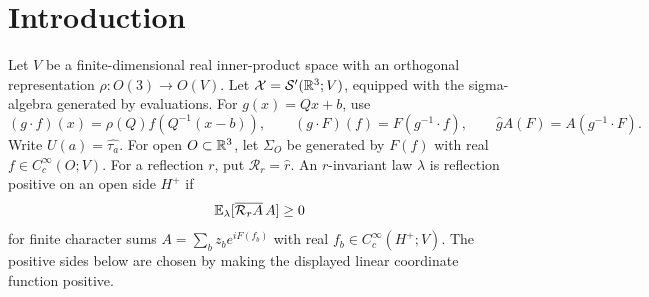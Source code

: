 \begin{abstract}
A translation-invariant law of finite-component tempered fields in
three dimensions is assumed invariant and reflection positive at the
coordinate and diagonal planes. We prove clustering relative to its
translation-invariant sigma-algebra. Almost every translation-ergodic
component retains the reflection properties and is mixing in every
direction. The proof uses a diagonal reflection to obtain a spectral
cone, then identifies zero-energy vectors with translation-invariant
observables. If the parent law also satisfies an \(L^2\) Gaussian
bound, the same constant holds in almost every component.
\end{abstract}
\maketitle
\tableofcontents
\section{Introduction}\label{sec:introduction}
Let \(V\) be a finite-dimensional real inner-product space with an
orthogonal representation \(\rho:O(3)\to O(V)\). Let
\(\mathcal X=\mathcal S'(\mathbb R^3;V)\), equipped with the sigma-algebra
generated by evaluations. For \(g(x)=Qx+b\), use
\begin{equation}\label{eq:euclidean-action}
 (g\cdot f)(x)=\rho(Q)f(Q^{-1}(x-b)),\qquad
 (g\cdot F)(f)=F(g^{-1}\cdot f),\qquad
 \widehat g A(F)=A(g^{-1}\cdot F).
\end{equation}
Write \(U(a)=\widehat{\tau_a}\).
For open \(O\subset\mathbb R^3\), let \(\Sigma_O\) be generated by
\(F(f)\) with real \(f\in C_c^\infty(O;V)\).
For a reflection \(r\), put \(\mathcal R_r=\widehat r\).
An \(r\)-invariant law \(\lambda\) is reflection positive on an
open side \(H^+\) if
\[
 \mathbb E_\lambda[\overline{\mathcal R_r A}\,A]\ge0
\]
for finite character sums \(A=\sum_bz_be^{iF(f_b)}\) with
real \(f_b\in C_c^\infty(H^+;V)\).
The positive sides below are chosen by making the displayed linear
coordinate function positive.

